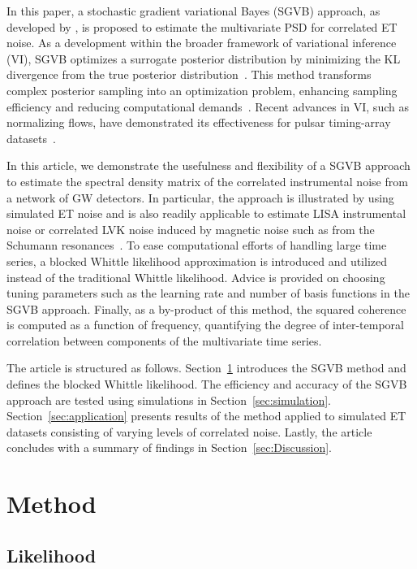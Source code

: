 \documentclass[%
 reprint,
 amsmath,amssymb,
 aps,
 nofootinbib,
]{revtex4-2}
\begin{document}
In this paper, a stochastic gradient variational Bayes (SGVB) approach, as developed by \citet{Hu2023}, is proposed to estimate the multivariate \ac{PSD} for correlated \ac{ET} noise. As a development within the broader framework of variational inference (VI), SGVB optimizes a surrogate posterior distribution by minimizing the \ac{KL} divergence from the true posterior distribution~\cite{Jordan1999,Wainwright2008,Blei2017}.  
This method transforms complex posterior sampling into an optimization problem, enhancing sampling efficiency and reducing computational demands~\cite{Blei2006,kingma2022}.
Recent advances in VI, such as normalizing flows, have demonstrated its effectiveness for pulsar timing-array datasets~\cite{Vallisneri2024}. 


In this article, we demonstrate the usefulness and flexibility of a SGVB approach to estimate the spectral density matrix of the correlated instrumental noise from a  network of \ac{GW} detectors.
In particular, the approach is illustrated by using simulated ET noise and is also readily applicable to estimate  \ac{LISA} instrumental noise or correlated \ac{LVK} noise induced by magnetic noise such as from the Schumann resonances~\cite{Thrane_correlations_SGWB}.
To ease computational efforts of handling large time series, a blocked Whittle likelihood approximation is introduced and utilized instead of the traditional Whittle likelihood. 
Advice is provided on choosing tuning parameters such as the learning rate and number of basis functions in the SGVB approach. 
Finally, as a by-product of this method, the squared coherence is computed  as a function of frequency, quantifying the degree of inter-temporal correlation between components of the multivariate time series. 

The article is structured as follows.
Section~\ref{sec:method} introduces the \ac{SGVB} method and defines the blocked Whittle likelihood.
The efficiency and accuracy of the SGVB approach are tested using simulations in Section~\ref{sec:simulation}. 
Section~\ref{sec:application} presents results of the method applied to simulated \ac{ET} datasets consisting of varying levels of correlated noise. 
Lastly, the article concludes with a summary of findings in Section~\ref{sec:Discussion}.

\section{Method}
\label{sec:method}

\subsection{Likelihood}
\end{document}
